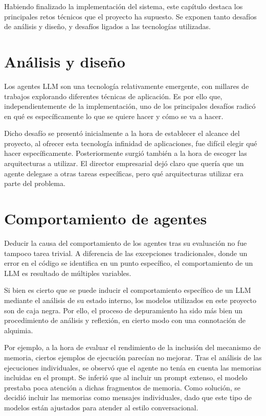 Habiendo finalizado la implementación del sistema, este capítulo destaca los principales retos técnicos que el proyecto ha supuesto. Se exponen tanto desafíos de análisis y diseño, y desafíos ligados a las tecnologías utilizadas. 

\section{Análisis y diseño}
Los agentes LLM son una tecnología relativamente emergente, con millares de trabajos explorando diferentes técnicas de aplicación. Es por ello que, independientemente de la implementación, uno de los principales desafíos radicó en qué es específicamente lo que se quiere hacer y cómo se va a hacer.

Dicho desafío se presentó inicialmente a la hora de establecer el alcance del proyecto, al ofrecer esta tecnología infinidad de aplicaciones, fue difícil elegir qué hacer específicamente. Posteriormente surgió también a la hora de escoger las arquitecturas a utilizar. El director empresarial dejó claro que quería que un agente delegase a otras tareas específicas, pero qué arquitecturas utilizar era parte del problema. 

\section{Comportamiento de agentes}
Deducir la causa del comportamiento de los agentes tras su evaluación no fue tampoco tarea trivial. A diferencia de las excepciones tradicionales, donde un error en el código se identifica en un punto específico, el comportamiento de un LLM es resultado de múltiples variables. 

Si bien es cierto que se puede inducir el comportamiento específico de un LLM mediante el análisis de su estado interno, los modelos utilizados en este proyecto son de caja negra. Por ello, el proceso de depuramiento ha sido más bien un procedimiento de análisis y reflexión, en cierto modo con una connotación de alquimia. 

Por ejemplo, a la hora de evaluar el rendimiento de la inclusión del mecanismo de memoria, ciertos ejemplos de ejecución parecían no mejorar. Tras el análisis de las ejecuciones individuales, se observó que el agente no tenía en cuenta las memorias incluidas en el prompt. Se inferió que al incluir un prompt extenso, el modelo prestaba poca atención a dichas fragmentos de memoria. Como solución, se decidió incluir las memorias como mensajes individuales, dado que este tipo de modelos están ajustados para atender al estilo conversacional. 
